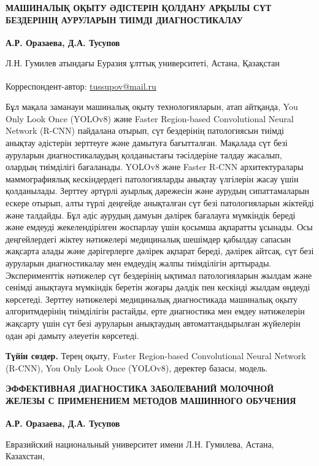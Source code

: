 
{\bfseries МАШИНАЛЫҚ ОҚЫТУ ӘДІСТЕРІН ҚОЛДАНУ АРҚЫЛЫ СҮТ БЕЗДЕРІНІҢ
АУРУЛАРЫН ТИІМДІ ДИАГНОСТИКАЛАУ}

{\bfseries А.Р. Оразаева, Д.А. Тусупов\textsuperscript{\envelope }}

Л.Н. Гумилев атындағы Еуразия ұлттық университеті, Астана, Қазақстан

\raggedright {\bfseries \textsuperscript{\envelope }}Корреспондент-автор: \href{mailto:oaris.83@gmail.com}{tussupov@mail.ru}

Бұл мақала заманауи машиналық оқыту технологияларын, атап айтқанда, You
Only Look Once (YOLOv8) және Faster Region-based Convolutional Neural
Network (R-CNN) пайдалана отырып, сүт бездерінің патологиясын тиімді
анықтау әдістерін зерттеуге және дамытуға бағытталған. Мақалада сүт безі
ауруларын диагностикалаудың қолданыстағы тәсілдеріне талдау жасалып,
олардың тиімділігі бағаланады. YOLOv8 және Faster R-CNN архитектуралары
маммографиялық кескіндердегі патологияларды анықтау үлгілерін жасау үшін
қолданылады. Зерттеу әртүрлі ауырлық дәрежесін және аурудың
сипаттамаларын ескере отырып, алты түрлі деңгейде анықталған сүт безі
патологияларын жіктейді және талдайды. Бұл әдіс аурудың дамуын дәлірек
бағалауға мүмкіндік береді және емдеуді жекелендірілген жоспарлау үшін
қосымша ақпаратты ұсынады. Осы деңгейлердегі жіктеу нәтижелері
медициналық шешімдер қабылдау сапасын жақсарта алады және дәрігерлерге
дәлірек ақпарат береді, дәлірек айтсақ, сүт безі ауруларын
диагностикалау мен емдеудің жалпы тиімділігін арттырады. Эксперименттік
нәтижелер сүт бездерінің ықтимал патологияларын жылдам және сенімді
анықтауға мүмкіндік беретін жоғары дәлдік пен кескінді жылдам өңдеуді
көрсетеді. Зерттеу нәтижелері медициналық диагностикада машиналық оқыту
алгоритмдерінің тиімділігін растайды, ерте диагностика мен емдеу
нәтижелерін жақсарту үшін сүт безі ауруларын анықтаудың
автоматтандырылған жүйелерін одан әрі дамыту әлеуетін көрсетеді.

{\bfseries Түйін сөздер.} Терең оқыту, Faster Region-based Convolutional
Neural Network (R-CNN), You Only Look Once (YOLOv8), деректер базасы,
модель.

{\bfseries ЭФФЕКТИВНАЯ ДИАГНОСТИКА ЗАБОЛЕВАНИЙ МОЛОЧНОЙ ЖЕЛЕЗЫ С
ПРИМЕНЕНИЕМ МЕТОДОВ МАШИННОГО ОБУЧЕНИЯ}

{\bfseries А.Р. Оразаева, Д.А. Тусупов \textsuperscript{\envelope }}

Евразийский национальный университет имени Л.Н. Гумилева, Астана,
Казахстан,

